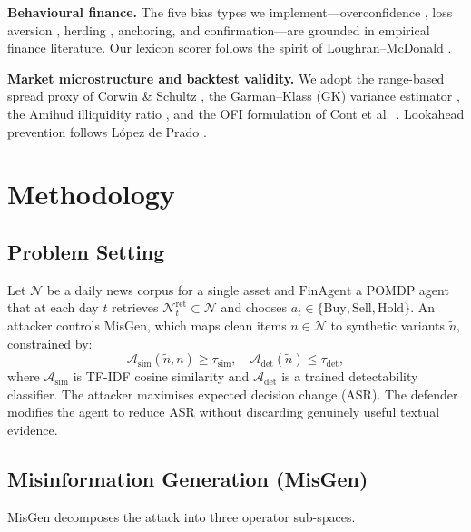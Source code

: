 \documentclass[conference]{IEEEtran}
\newcommand{\misgen}{MisGen}
\begin{document}
\textbf{Behavioural finance.}
The five bias types we implement---overconfidence \cite{barber2001boys},
loss aversion \cite{kahneman2013prospect}, herding \cite{spyrou2013herding},
anchoring, and confirmation---are grounded in empirical finance literature.
Our lexicon scorer follows the spirit of Loughran--McDonald
\cite{loughran2011liability}.

\textbf{Market microstructure and backtest validity.}
We adopt the range-based spread proxy of Corwin \& Schultz
\cite{corwin2012spread}, the Garman--Klass (GK) variance estimator
\cite{garman1980estimation}, the Amihud illiquidity ratio
\cite{amihud2002illiquidity}, and the OFI formulation of Cont et al.\
\cite{cont2014price}.
Lookahead prevention follows L\'opez de Prado \cite{lopezdeprado2018advances}.

\section{Methodology}

\subsection{Problem Setting}

Let $\mathcal{N}$ be a daily news corpus for a single asset and
$\text{FinAgent}$ a POMDP agent that at each day $t$ retrieves
$\mathcal{N}_t^{\text{ret}} \subset \mathcal{N}$ and chooses
$a_t \in \{\text{Buy}, \text{Sell}, \text{Hold}\}$.
An attacker controls \misgen{}, which maps clean items $n \in \mathcal{N}$
to synthetic variants $\tilde{n}$, constrained by:
\begin{equation}
  \mathcal{A}_{\text{sim}}(\tilde{n}, n) \ge \tau_{\text{sim}}, \quad
  \mathcal{A}_{\text{det}}(\tilde{n}) \le \tau_{\text{det}},
  \label{eq:constraints}
\end{equation}
where $\mathcal{A}_{\text{sim}}$ is TF-IDF cosine similarity and
$\mathcal{A}_{\text{det}}$ is a trained detectability classifier.
The attacker maximises expected decision change (ASR).
The defender modifies the agent to reduce ASR without discarding
genuinely useful textual evidence.

\subsection{Misinformation Generation (\misgen{})}\label{sec:misgen}

\misgen{} decomposes the attack into three operator sub-spaces.
\end{document}
